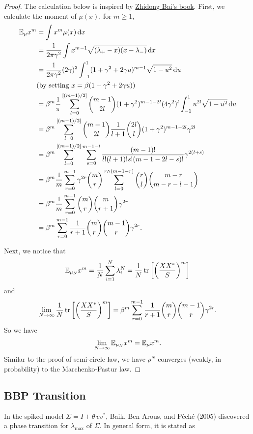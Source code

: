 \begin{proof}
    The calculation below is inspired by \href{http://ndl.ethernet.edu.et/bitstream/123456789/60805/1/140.pdf}{Zhidong Bai's book}.
    First, we calculate the moment of $\mu(x)$, for $m\ge 1$,
    \begin{align*}
        \mathbb{E}_{\mu} x^m &= \int x^m \mu(x)\mathop{}\!\mathrm{d} x\\
        &= \frac{1}{2\pi\gamma^2}\int x^{m-1} \sqrt{(\lambda_{+}-x)(x-\lambda_{-})} \mathop{}\!\mathrm{d} x\\
        &= \frac{1}{2\pi\gamma^2}(2\gamma)^2\int_{-1}^1 (1+\gamma^2+2\gamma u)^{m-1}\sqrt{1-u^2}\mathop{}\!\mathrm{d} u
        \\
        &(\text{by setting }x =\beta(1+\gamma^2+2\gamma u))\\
        &= \beta^m\frac{1}{\pi}\sum_{l=0}^{[(m-1)/2]} \binom{m-1}{2l}(1+\gamma^2)^{m-1-2l}
        (4\gamma^2)^l
        \int_{-1}^1 u^{2l}\sqrt{1-u^2}\mathop{}\!\mathrm{d} u\\
        &= \beta^m
        \sum_{l=0}^{[(m-1)/2]} \binom{m-1}{2l} 
        \frac{1}{l+1}\binom{2l}{l} (1+\gamma^2)^{m-1-2l} \gamma^{2l}\\
        &= \beta^m\sum_{l=0}^{[(m-1)/2]}\sum_{s=0}^{m-1-l} \frac{(m-1)!}{l!(l+1)!s!(m-1-2l-s)!}\gamma^{2(l+s)}\\
        &=\beta^m \frac{1}{m}\sum_{r=0}^{m-1} \gamma^{2r} \binom{m}{r} \sum_{l=0}^{r\wedge(m-1-r)}\binom{r}{l} \binom{m-r}{m-r-l-1}\\
        &=\beta^m \frac{1}{m}\sum_{r=0}^{m-1}\binom{m}{r}\binom{m}{r+1}\gamma^{2r}\\
        &=\beta^m \sum_{r=0}^{m-1}\frac{1}{r+1}\binom{m}{r}\binom{m-1}{r}\gamma^{2r}.
    \end{align*}

    Next, we notice that
    \[
        \mathbb{E}_{\mu_N} x^m =\frac{1}{N} \sum_{i=1}^N \lambda_i^N = \frac{1}{N}\operatorname{tr}\left[\left(\frac{XX^*}{S}\right)^m\right]
    \]
    and
    \[
    \lim_{N\to \infty} \frac{1}{N}\operatorname{tr}\left[\left(\frac{XX^*}{S}\right)^m\right] = \beta^m \sum_{r=0}^{m-1}\frac{1}{r+1}\binom{m}{r}\binom{m-1}{r}\gamma^{2r}.
    \]
    So we have
    \[
    \lim_{N\to \infty}\mathbb{E}_{\mu_N} x^m = \mathbb{E}_{\mu} x^m.
    \]
    Similar to the proof of semi-circle law, we have $\rho^N$ converges (weakly, in probability) to the Marchenko-Pastur law.
\end{proof}


\subsection{BBP Transition}
In the spiked model $\Sigma = I + \theta\, vv^*$, Baik, Ben Arous, and P\'{e}ch\'{e} (2005) discovered a phase transition for $\lambda_{\max}$ of $\Sigma$. In general form, it is stated as

